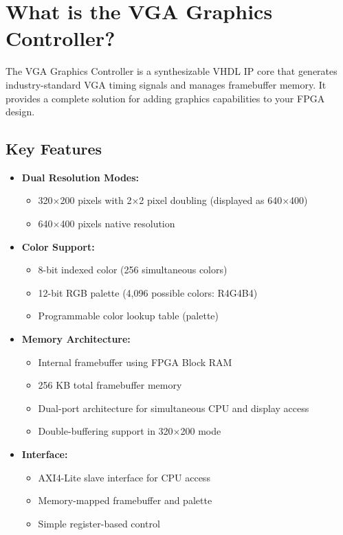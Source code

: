 \documentclass[11pt,letterpaper]{report}
\begin{document}
\section{What is the VGA Graphics Controller?}

The VGA Graphics Controller is a synthesizable VHDL IP core that generates industry-standard VGA timing signals and manages framebuffer memory. It provides a complete solution for adding graphics capabilities to your FPGA design.

\subsection{Key Features}

\begin{itemize}
    \item \textbf{Dual Resolution Modes:}
    \begin{itemize}
        \item 320$\times$200 pixels with 2$\times$2 pixel doubling (displayed as 640$\times$400)
        \item 640$\times$400 pixels native resolution
    \end{itemize}
    
    \item \textbf{Color Support:}
    \begin{itemize}
        \item 8-bit indexed color (256 simultaneous colors)
        \item 12-bit RGB palette (4,096 possible colors: R4G4B4)
        \item Programmable color lookup table (palette)
    \end{itemize}
    
    \item \textbf{Memory Architecture:}
    \begin{itemize}
        \item Internal framebuffer using FPGA Block RAM
        \item 256 KB total framebuffer memory
        \item Dual-port architecture for simultaneous CPU and display access
        \item Double-buffering support in 320$\times$200 mode
    \end{itemize}
    
    \item \textbf{Interface:}
    \begin{itemize}
        \item AXI4-Lite slave interface for CPU access
        \item Memory-mapped framebuffer and palette
        \item Simple register-based control
    \end{itemize}
    

\end{itemize}
\end{document}
